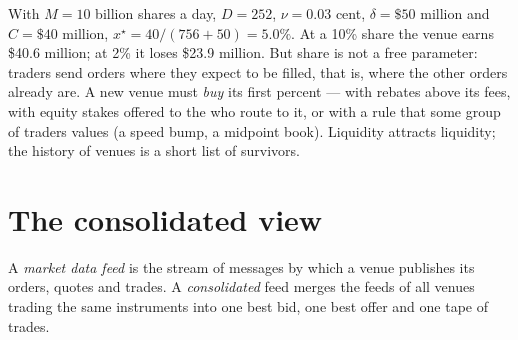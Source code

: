 \begin{example}\label{ex:m1:exchanges-brokers-venues:five}
With $M = 10$ billion shares a day, $D = 252$, $\nu = 0.03$ cent, $\delta =
\$50$ million and $C = \$40$ million, $x^\star = 40/(756+50) = 5.0\%$. At a
10\% share the venue earns \$40.6 million; at 2\% it loses \$23.9 million.
But share is not a free parameter: traders send orders where they expect to
be filled, that is, where the other orders already are. A new venue must
\emph{buy} its first percent --- with rebates above its fees, with equity
stakes offered to the  who route to it, or with a rule that some group
of traders values (a speed bump, a midpoint book). Liquidity attracts
liquidity; the history of venues is a short list of survivors.
\end{example}

\begin{omfigure}

\end{omfigure}

\section{The consolidated view}

\begin{definition}\label{def:m1:exchanges-brokers-venues:feed}
A \emph{market data feed} is the stream of messages
by which a venue publishes its orders, quotes and trades. A
\emph{consolidated} feed merges the feeds of all venues trading the same
instruments into one best bid, one best offer and one tape of trades.
\end{definition}

